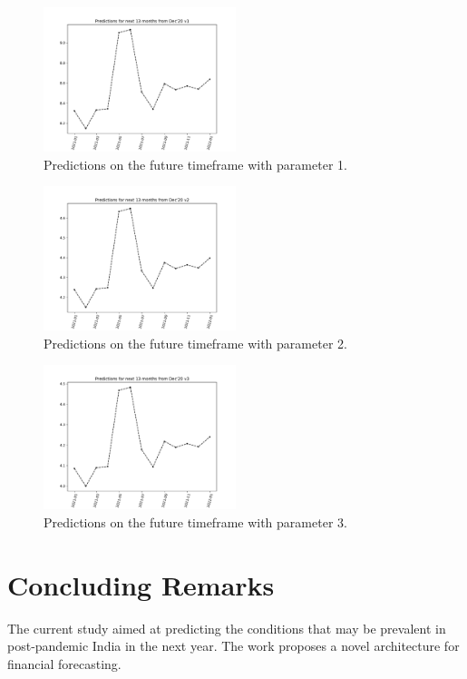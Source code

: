 \documentclass[10pt,journal,compsoc]{IEEEtran}
\begin{document}
\begin{figure}[!t]
	\centering
	\includegraphics[width=0.5\textwidth]{Figures/Preds_v1.pdf}
	\caption{Predictions on the future timeframe with parameter 1.}
	\label{Preds_v1}
\end{figure}

\begin{figure}[!t]
	\centering
	\includegraphics[width=0.5\textwidth]{Figures/Preds_v2.pdf}
	\caption{Predictions on the future timeframe with parameter 2.}
	\label{Preds_v2}
\end{figure}

\begin{figure}[!t]
	\centering
	\includegraphics[width=0.5\textwidth]{Figures/Preds_v3.pdf}
	\caption{Predictions on the future timeframe with parameter 3.}
	\label{Preds_v3}
\end{figure}


\section{Concluding Remarks}\label{Sec_Final}
The current study aimed at predicting the conditions that may be prevalent in post-pandemic India in the next year. The work proposes a novel architecture for financial forecasting. 
\end{document}
